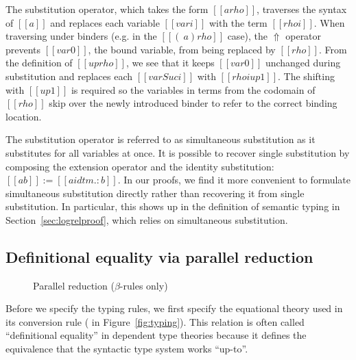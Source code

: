 \documentclass[acmsmall,screen=true,
\ifpublic review=false\else,review=true\fi
  ,anonymous=\ifanonymous true\else false\fi]{acmart}
\newcommand{\scw}[1]{}
\begin{document}
The substitution operator, which takes the form $[[a {rho}]]$,
traverses the syntax of $[[a]]$ and replaces each variable $[[var i]]$
with the term $[[rho i]]$. When traversing under binders (e.g. in the
$[[(\ a) { rho }]]$ case), the $\Uparrow$ operator prevents $[[var
0]]$, the bound variable, from being replaced by
$[[rho]]$. From the definition of $[[up rho]]$, we see that it keeps
$[[var 0]]$ unchanged during substitution and replaces each $[[var
Suc i]]$ with $[[rho i {up 1}]]$. The shifting with $[[up 1]]$
is required so the variables in terms from the codomain of $[[rho]]$ skip over
the newly introduced binder to refer to the correct binding
location.

The substitution operator is referred to as simultaneous substitution as it
substitutes for all variables at once. It is possible to recover single
substitution by composing the extension operator and the identity
substitution: $[[a { b }]] := [[a { idtm .: b }]]$. In our proofs, we find it
more convenient to formulate simultaneous substitution directly rather than
recovering it from single substitution.  In particular, this shows up in the
definition of semantic typing in Section~\ref{sec:logrelproof}, which relies
on simultaneous substitution.

\subsection{Definitional equality via parallel reduction}

\begin{figure}[h]
\begin{minipage}{0.9\textwidth}
\end{minipage}
\caption{Parallel reduction ($\beta$-rules only) }
\label{fig:par}
\end{figure}

Before we specify the typing rules, we first specify the equational theory
used in its conversion rule ( in Figure~\ref{fig:typing}). This
relation is often called ``definitional equality'' in dependent type theories
because it defines the equivalence that the syntactic type system works
``up-to''.
\end{document}
